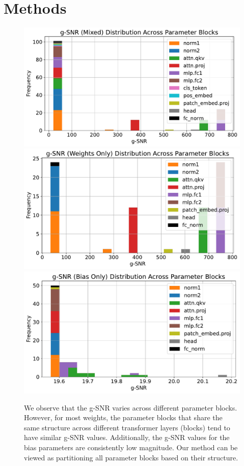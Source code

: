 \section{Methods}


\begin{figure}[!ht]
    \centering
    \includegraphics[width=0.33\linewidth]{images/gsnr_across_blocks_mix.pdf}
    \includegraphics[width=0.33\linewidth]{images/gsnr_across_blocks_weights.pdf}
    \includegraphics[width=0.33\linewidth]{images/gsnr_across_blocks_biases.pdf}
    \caption{We observe that the g-SNR varies across different parameter blocks. However, for most weights, the parameter blocks that share the same structure across different transformer layers (blocks) tend to have similar g-SNR values. Additionally, the g-SNR values for the bias parameters are consistently low magnitude. Our method can be viewed as partitioning all parameter blocks based on their structure.}
    \label{fig:gsnr_across_blocks_hist}
\end{figure}


